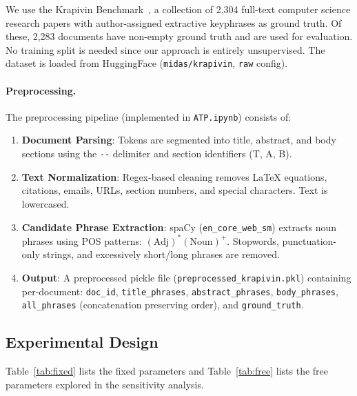 \documentclass[pdflatex,sn-mathphys-num]{sn-jnl}
\begin{document}
We use the Krapivin Benchmark~\cite{krapivin2009}, a collection of 2,304 full-text computer
science research papers with author-assigned extractive keyphrases as ground truth. Of these, 2,283
documents have non-empty ground truth and are used for evaluation. No training split is needed since
our approach is entirely unsupervised. The dataset is loaded from HuggingFace
(\texttt{midas/krapivin}, \texttt{raw} config).

\paragraph{Preprocessing.}
The preprocessing pipeline (implemented in \texttt{ATP.ipynb}) consists of:
\begin{enumerate}
  \item \textbf{Document Parsing}: Tokens are segmented into title, abstract, and body sections
        using the \texttt{-{}-} delimiter and section identifiers (T, A, B).
  \item \textbf{Text Normalization}: Regex-based cleaning removes \LaTeX{} equations, citations,
        emails, URLs, section numbers, and special characters. Text is lowercased.
  \item \textbf{Candidate Phrase Extraction}: spaCy (\texttt{en\_core\_web\_sm}) extracts noun
        phrases using POS patterns: $(\text{Adj})^{*}(\text{Noun})^{+}$. Stopwords,
        punctuation-only strings, and excessively short/long phrases are removed.
  \item \textbf{Output}: A preprocessed pickle file (\texttt{preprocessed\_krapivin.pkl}) containing
        per-document: \texttt{doc\_id}, \texttt{title\_phrases}, \texttt{abstract\_phrases},
        \texttt{body\_phrases}, \texttt{all\_phrases} (concatenation preserving order), and
        \texttt{ground\_truth}.
\end{enumerate}

\subsection{Experimental Design}\label{sec:design}

Table~\ref{tab:fixed} lists the fixed parameters and Table~\ref{tab:free} lists the free parameters
explored in the sensitivity analysis.
\end{document}
